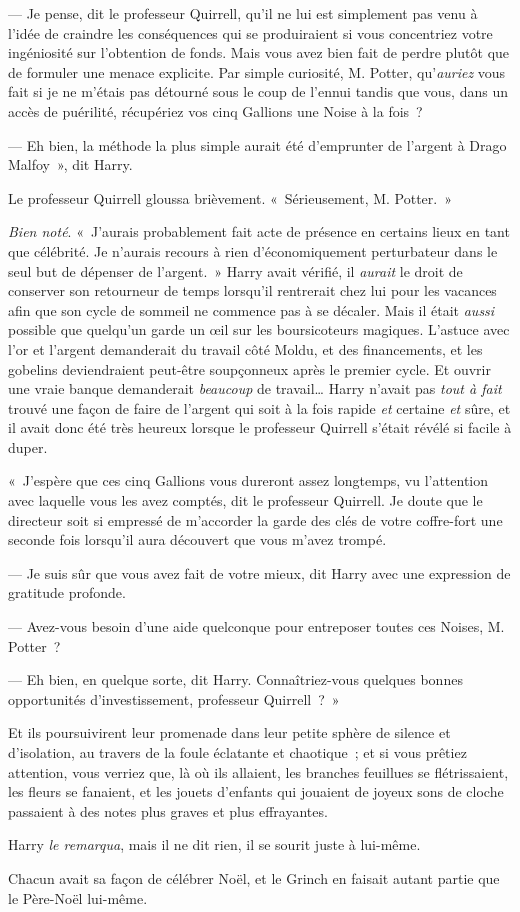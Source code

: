 --- Je pense, dit le professeur Quirrell, qu'il ne lui est simplement pas venu à l'idée de craindre les conséquences qui se produiraient si vous concentriez votre ingéniosité sur l'obtention de fonds.
Mais vous avez bien fait de perdre plutôt que de formuler une menace explicite.
Par simple curiosité, M. Potter, qu'\emph{auriez} vous fait si je ne m'étais pas détourné sous le coup de l'ennui tandis que vous, dans un accès de puérilité, récupériez vos cinq Gallions une Noise à la fois~?

--- Eh bien, la méthode la plus simple aurait été d'emprunter de l'argent à Drago Malfoy~», dit Harry.

Le professeur Quirrell gloussa brièvement.
«~Sérieusement, M. Potter.~»

\emph{Bien noté}.
«~J'aurais probablement fait acte de présence en certains lieux en tant que célébrité.
Je n'aurais recours à rien d'économiquement perturbateur dans le seul but de dépenser de l'argent.~»
Harry avait vérifié, il \emph{aurait} le droit de conserver son retourneur de temps lorsqu'il rentrerait chez lui pour les vacances afin que son cycle de sommeil ne commence pas à se décaler.
Mais il était \emph{aussi} possible que quelqu'un garde un œil sur les boursicoteurs magiques.
L'astuce avec l'or et l'argent demanderait du travail côté Moldu, et des financements, et les gobelins deviendraient peut-être soupçonneux après le premier cycle.
Et ouvrir une vraie banque demanderait \emph{beaucoup} de travail…
Harry n'avait pas \emph{tout à fait} trouvé une façon de faire de l'argent qui soit à la fois rapide \emph{et} certaine \emph{et} sûre, et il avait donc été très heureux lorsque le professeur Quirrell s'était révélé si facile à duper.

«~J'espère que ces cinq Gallions vous dureront assez longtemps, vu l'attention avec laquelle vous les avez comptés, dit le professeur Quirrell.
Je doute que le directeur soit si empressé de m'accorder la garde des clés de votre coffre-fort une seconde fois lorsqu'il aura découvert que vous m'avez trompé.

--- Je suis sûr que vous avez fait de votre mieux, dit Harry avec une expression de gratitude profonde.

--- Avez-vous besoin d'une aide quelconque pour entreposer toutes ces Noises, M. Potter~?

--- Eh bien, en quelque sorte, dit Harry.
Connaîtriez-vous quelques bonnes opportunités d'investissement, professeur Quirrell~?~»

Et ils poursuivirent leur promenade dans leur petite sphère de silence et d'isolation, au travers de la foule éclatante et chaotique~; et si vous prêtiez attention, vous verriez que, là où ils allaient, les branches feuillues se flétrissaient, les fleurs se fanaient, et les jouets d'enfants qui jouaient de joyeux sons de cloche passaient à des notes plus graves et plus effrayantes.

Harry \emph{le remarqua}, mais il ne dit rien, il se sourit juste à lui-même.

Chacun avait sa façon de célébrer Noël, et le Grinch en faisait autant partie que le Père-Noël lui-même.
